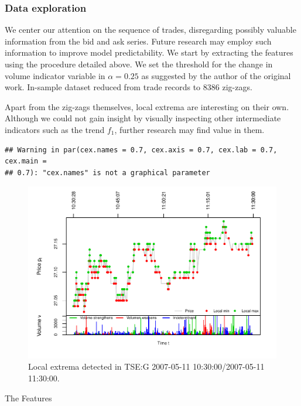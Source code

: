 \documentclass[]{article}
\begin{document}
\subsubsection{Data exploration}\label{data-exploration}

We center our attention on the sequence of trades, disregarding possibly
valuable information from the bid and ask series. Future research may
employ such information to improve model predictability. We start by
extracting the features using the procedure detailed above. We set the
threshold for the change in volume indicator variable in
\(\alpha = 0.25\) as suggested by the author of the original work.
In-sample dataset reduced from trade records to 8386 zig-zags.

Apart from the zig-zags themselves, local extrema are interesting on
their own. Although we could not gain insight by visually inspecting
other intermediate indicators such as the trend \(f_1\), further
research may find value in them.

\begin{verbatim}
## Warning in par(cex.names = 0.7, cex.axis = 0.7, cex.lab = 0.7, cex.main =
## 0.7): "cex.names" is not a graphical parameter
\end{verbatim}

\begin{figure}[H]
\includegraphics[width=\textwidth]{main_files/figure-latex/unnamed-chunk-7-1} \caption{Local extrema detected in TSE:G 2007-05-11 10:30:00/2007-05-11 11:30:00. \label{tseg-ins-extrema}}\label{fig:unnamed-chunk-7}
\end{figure}

The Features
\end{document}
